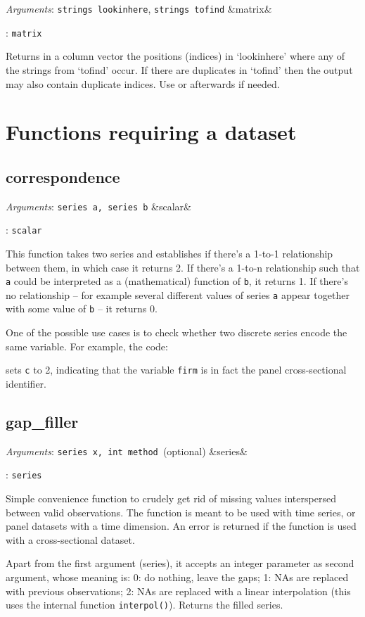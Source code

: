 \documentclass[11pt,english]{article}
\newcommand{\ArgRet}[2]{%
  {\it Arguments}: {#1}%
  \ifx&#2&%
  \else
  \par\smallskip\noindent {\it Return type}: \texttt{#2}
  \fi%
  \par\medskip\par%
  }
\begin{document}
\ArgRet{\texttt{strings lookinhere}, \texttt{strings tofind}}{matrix}

Returns in a column vector the positions (indices) in `lookinhere' where any of the
strings from `tofind' occur. If there are duplicates in `tofind' then the output
may also contain duplicate indices. Use  or  afterwards if needed.


\section{Functions requiring a dataset}

\subsection{correspondence}

\ArgRet{\texttt{series a, series b}}{scalar}

This function takes two series and establishes if there's a 1-to-1
relationship between them, in which case it returns 2.  If there's a
1-to-n relationship such that \texttt{a} could be interpreted as a (mathematical)
function of \texttt{b}, it returns 1. If there's no relationship -- for example several
different values of series \texttt{a} appear together with some value of \texttt{b} -- it
returns 0.

One of the possible use cases is to check whether two
discrete series encode the same variable. For example, the code:
sets \texttt{c} to 2, indicating that the variable \texttt{firm} is in
fact the panel cross-sectional identifier.

\subsection{gap\_filler}

\ArgRet{\texttt{series x, int method }(optional)}{series}

Simple convenience function to crudely get rid of missing values
interspersed between valid observations. The function is meant to be
used with time series, or panel datasets with a time dimension. An
error is returned if the function is used with a cross-sectional
dataset.

Apart from the first argument (series), it accepts an integer
parameter as second argument, whose meaning is: 0: do nothing, leave
the gaps; 1: NAs are replaced with previous observations; 2: NAs are
replaced with a linear interpolation (this uses the internal function
\texttt{interpol()}). Returns the filled series.
\end{document}
